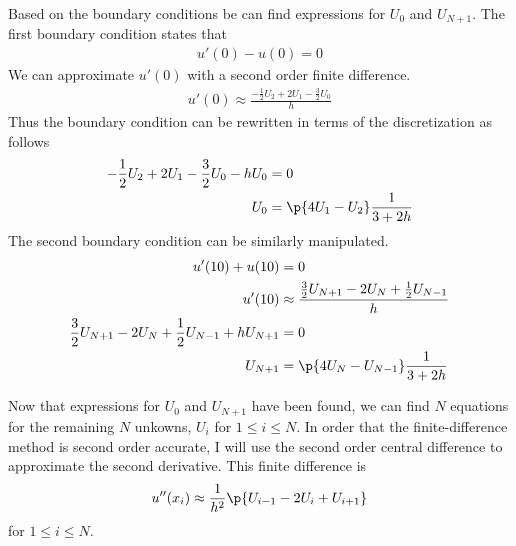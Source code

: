 \documentclass[11pt, oneside]{article}
\begin{document}
\begin{enumerate}
        Based on the boundary conditions be can find expressions for $U_0$ and
        $U_{N+1}$.
        The first boundary condition states that
        \begin{align*}
            u'(0) - u(0) = 0
        \end{align*}
        We can approximate $u'(0)$ with a second order finite difference.
        \begin{align*}
            u'(0) \approx \frac{-\frac{1}{2}U_2 + 2U_1 - \frac{3}{2}U_0}{h}
        \end{align*}
        Thus the boundary condition can be rewritten in terms of the
        discretization as follows
        \begin{align*}
            -\frac{1}{2}U_2 + 2U_1 - \frac{3}{2}U_0 - hU_0 &= 0 \\
            U_0 &= \p{4U_1 - U_2} \frac{1}{3 + 2h}
        \end{align*}
        The second boundary condition can be similarly manipulated.
        \begin{align*}
            u'(10) + u(10) &= 0 \\
            u'(10) &\approx  \frac{\frac{3}{2}U_{N+1} - 2U_N + \frac{1}{2}U_{N-1}}{h}\\
            \frac{3}{2}U_{N+1} - 2U_N + \frac{1}{2}U_{N-1} + hU_{N+1} &= 0 \\
            U_{N+1} &= \p{4U_N - U_{N-1}} \frac{1}{3 + 2h}
        \end{align*}

        Now that expressions for $U_0$ and $U_{N+1}$ have been found, we can
        find $N$ equations for the remaining $N$ unkowns, $U_{i}$ for
        $1 \le i \le N$.
        In order that the finite-difference method is second order accurate, I
        will use the second order central difference to approximate the second
        derivative.
        This finite difference is
        \begin{align*}
            u''(x_i) \approx \frac{1}{h^2}\p{U_{i-1} - 2U_{i} + U_{i+1}}
        \end{align*}
        for $1 \le i \le N$.


\end{enumerate}
\end{document}
